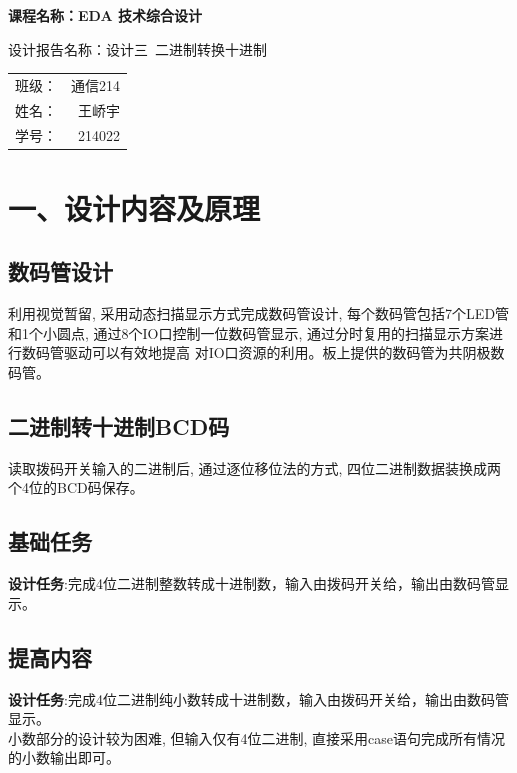 \documentclass{article}
\newcommand{\fourhao}{\fontsize{14pt}{\baselineskip}\selectfont} %
\newcommand{\xiaosihao}{\fontsize{12pt}{\baselineskip}\selectfont} %
\begin{document}
\begin{titlepage}
    \centering
    \vspace*{2cm}

    \Huge
    \textbf{课程名称：EDA 技术综合设计}

    \vspace{2cm}

    \LARGE
    设计报告名称：设计三\ 二进制转换十进制

    \vspace{4cm}

    \centering
    \Large
    \begin{tabular}{rl}
        班级： & 通信214    \\
        姓名： & \ 王峤宇    \\
        学号： & \ 214022
    \end{tabular}

    \vfill

    \vspace{1cm}
\end{titlepage}

\newpage
\section*{\fourhao 一、设计内容及原理}
\xiaosihao
{}
\subsection*{数码管设计}
利用视觉暂留, 采用动态扫描显示方式完成数码管设计, 每个数码管包括7个LED管和1个小圆点, 
通过8个IO口控制一位数码管显示, 通过分时复用的扫描显示方案进行数码管驱动可以有效地提高
对IO口资源的利用。板上提供的数码管为共阴极数码管。\\
\subsection*{二进制转十进制BCD码}
读取拨码开关输入的二进制后, 通过逐位移位法的方式, 四位二进制数据装换成两个4位的BCD码保存。\\
\subsection*{基础任务}
\textbf{设计任务}:完成4位二进制整数转成十进制数，输入由拨码开关给，输出由数码管显示。\\
\subsection*{提高内容}
\textbf{设计任务}:完成4位二进制纯小数转成十进制数，输入由拨码开关给，输出由数码管显示。\\
小数部分的设计较为困难, 但输入仅有4位二进制, 直接采用case语句完成所有情况的小数输出即可。
\end{document}
